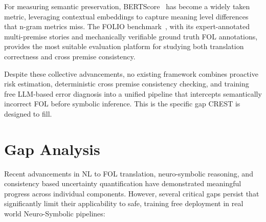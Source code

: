 For measuring semantic preservation, BERTScore~\cite{zhang2020bertscore} has become a widely taken metric, leveraging contextual embeddings to capture meaning level differences that n-gram metrics miss. The FOLIO benchmark~\cite{han2024folio}, with its expert-annotated multi-premise stories and mechanically verifiable ground truth FOL annotations, provides the most suitable evaluation platform for studying both translation correctness and cross premise consistency.

Despite these collective advancements, no existing framework combines proactive risk estimation, deterministic cross premise consistency checking, and training free LLM-based error diagnosis into a unified pipeline that intercepts semantically incorrect FOL before symbolic inference. This is the specific gap CREST is designed to fill.

\section{Gap Analysis}

Recent advancements in NL to FOL translation, neuro-symbolic reasoning, and consistency based uncertainty quantification have demonstrated meaningful progress across individual components. However, several critical gaps persist that significantly limit their applicability to safe, training free deployment in real world Neuro-Symbolic pipelines:

